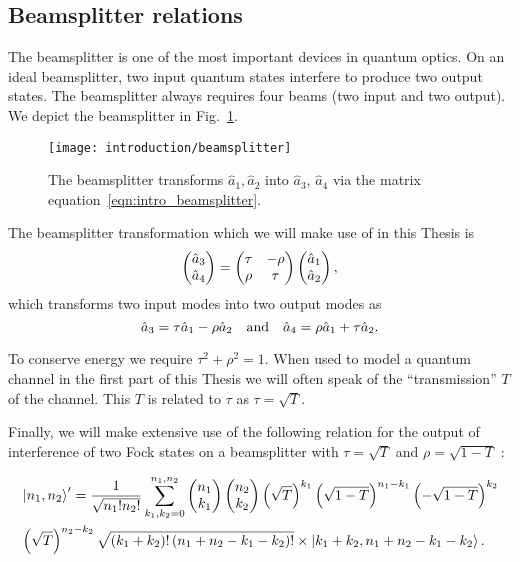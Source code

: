\FloatBarrier
\subsection{Beamsplitter relations}
The beamsplitter is one of the most important devices in quantum optics. On an ideal beamsplitter, two input quantum states interfere to produce two output states. The beamsplitter always requires four beams (two input and two output). We depict the beamsplitter in Fig.~\ref{fig:intro_beamsplitter}. %


\begin{figure}[htp]
\centering
\captionsetup{width=0.8\linewidth}
\texttt{[image: introduction/beamsplitter]}
\caption{\label{fig:intro_beamsplitter} The beamsplitter transforms $\hat{a}_1, \hat{a}_2$ into $\hat{a}_3$, $\hat{a}_4$ via the matrix equation~\ref{eqn:intro_beamsplitter}.}
\end{figure}


The beamsplitter transformation which we will make use of in this Thesis is
\begin{equation}\label{eqn:intro_beamsplitter}
\pmqty{\hat{a}_3 \\ \hat{a}_4} = \pmqty{\tau & -\rho \\  \rho & \tau} \pmqty{\hat{a}_1 \\ \hat{a}_2},
\end{equation}
which transforms two input modes into two output modes as
\begin{equation}
\hat{a}_3 = \tau \hat{a}_1 - \rho \hat{a}_2 \qq{and} \hat{a}_4 = \rho \hat{a}_1 + \tau \hat{a}_2.
\end{equation}

\noindent To conserve energy we require $\tau^2 + \rho^2 = 1$. When used to model a quantum channel in the first part of this Thesis we will often speak of the ``transmission'' $T$ of the channel. This $T$ is related to $\tau$ as $\tau = \sqrt{T}$. 

Finally, we will make extensive use of the following relation for the output of interference of two Fock states on a beamsplitter with $\tau = \sqrt{T}$ and $\rho  = \sqrt{1-T}$ \cite{Leonhardt2010}:

\begin{align}\label{eqn:intro_beamsplitter_fock}
&\ket{n_1, n_2}^\prime  = \frac{1}{\sqrt{n_1! n_2!}} \sum_{k_1, k_2=0}^{n_1, n_2} \pmqty{n_1 \\ k_1} \pmqty{n_2 \\ k_2} \left(\sqrt{T}\right)^{k_1} \left(\sqrt{1-T}\right)^{n_1 - k_1} \left(-\sqrt{1-T}\right)^{k_2} \notag \\
%
&\left(\sqrt{T}\right)^{n_2 - k_2} \sqrt{\left(k_1 + k_2\right)! \left(n_1 + n_2 - k_1 - k_2\right)!} \times \ket{k_1 + k_2, n_1 + n_2 - k_1 - k_2}.
\end{align}



